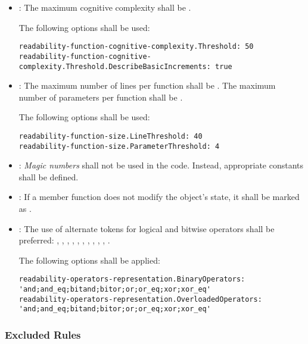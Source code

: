 \begin{itemize}
\item {}:
The maximum cognitive complexity shall be .

The following options shall be used:

\begin{lstlisting}
readability-function-cognitive-complexity.Threshold: 50
readability-function-cognitive-complexity.Threshold.DescribeBasicIncrements: true
\end{lstlisting}

\item {}:
The maximum number of lines per function shall be .
The maximum number of parameters per function shall be .

The following options shall be used:

\begin{lstlisting}
readability-function-size.LineThreshold: 40
readability-function-size.ParameterThreshold: 4
\end{lstlisting}

\item {}:
\emph{Magic numbers} shall not be used in the code.
Instead, appropriate constants shall be defined.

\item {}:
If a member function does not modify the object's state, it shall be marked as .

\item {}:
The use of alternate tokens for logical and bitwise operators shall be preferred:
, , , , ,
, , , , ,
.

The following options shall be applied:

\begin{lstlisting}
readability-operators-representation.BinaryOperators: 'and;and_eq;bitand;bitor;or;or_eq;xor;xor_eq'
readability-operators-representation.OverloadedOperators: 'and;and_eq;bitand;bitor;or;or_eq;xor;xor_eq'
\end{lstlisting}

\end{itemize}

\subsubsection{Excluded Rules}

